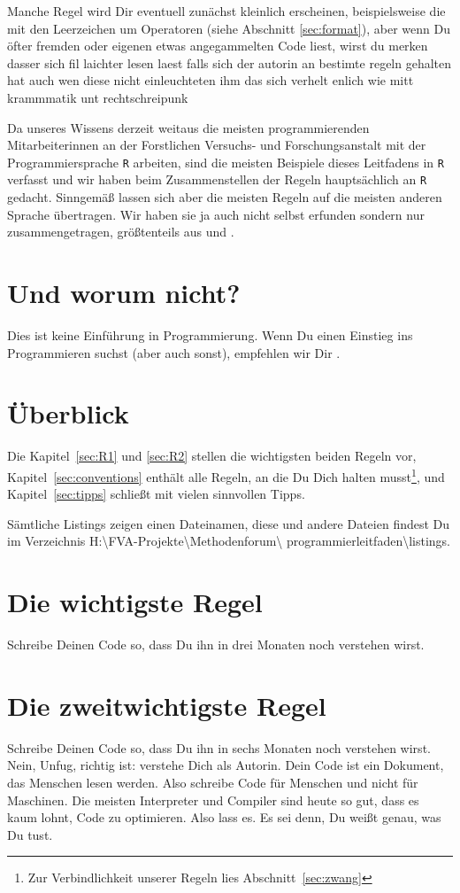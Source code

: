 \documentclass[twoside]{scrreprt}
\providecommand{\R}{\texttt{R}}
\providecommand{\FVA}[1]{Forstliche#1 Versuchs- und Forschungsanstalt}
\providecommand{\proot}{%
H:\textbackslash{}FVA-Projekte\textbackslash{}Methodenforum\textbackslash{}%
}
\providecommand{\pdir}{\proot{}programmierleitfaden\textbackslash{}}
\begin{document}
Manche Regel wird Dir eventuell zun\"a{}chst kleinlich erscheinen,
beispielsweise die mit den Leerzeichen  um  Operatoren (siehe Abschnitt
\ref{sec:format}), aber wenn Du \"o{}fter fremden oder eigenen etwas
angegammelten Code liest, wirst
du merken dasser sich fil laichter lesen laest falls sich der autorin an
bestimte regeln gehalten hat auch wen diese nicht einleuchteten ihm das
sich verhelt enlich wie mitt krammmatik unt rechtschreipunk

Da unseres Wissens derzeit weitaus die meisten programmierenden Mitarbeiterinnen
an der \FVA{n} mit der Programmiersprache \R{} arbeiten, sind die
meisten Beispiele dieses Leitfadens in \R{} verfasst und wir haben beim
Zusammenstellen der Regeln haupts\"a{}chlich an \R{} gedacht.
Sinngem\"a{}\ss{} lassen sich aber die meisten Regeln auf die meisten
anderen Sprache \"u{}bertragen. Wir haben sie ja auch nicht selbst erfunden
sondern nur zusammengetragen, gr\"o{}\ss{}tenteils aus \cite{cc} und \cite{wsp}.

\section{Und worum nicht?} Dies ist keine Einf\"u{}hrung in Programmierung.
Wenn Du einen Einstieg ins Programmieren suchst (aber auch sonst), empfehlen wir
Dir \cite{headfirst}.
\section{\"U{}berblick}
Die Kapitel~\ref{sec:R1} und \ref{sec:R2} stellen die wichtigsten beiden Regeln
vor, Kapitel~\ref{sec:conventions} enth\"a{}lt alle Regeln, an die Du Dich
halten musst\footnote{
  Zur Verbindlichkeit unserer Regeln lies Abschnitt~\ref{sec:zwang}
}, und Kapitel~\ref{sec:tipps} schlie\ss{}t mit vielen sinnvollen Tipps.

S\"a{}mtliche Listings zeigen einen Dateinamen, diese und andere  Dateien
findest Du im Verzeichnis 
\pdir{}listings.

\section{Die wichtigste Regel\label{sec:R1}}
Schreibe Deinen Code so, dass Du ihn in drei Monaten noch verstehen wirst.

\section{Die zweitwichtigste Regel\label{sec:R2}}
Schreibe Deinen Code so, dass Du ihn in sechs Monaten noch verstehen wirst.
Nein, Unfug, richtig ist: verstehe Dich als Autorin. Dein Code ist ein Dokument,
das Menschen lesen werden. Also schreibe Code f\"u{}r Menschen und nicht f\"u{}r
Maschinen. Die meisten Interpreter und Compiler sind heute so gut, dass es
kaum lohnt, Code zu optimieren. Also lass es. Es sei denn, Du wei\ss{}t
genau, was Du tust.
\end{document}
